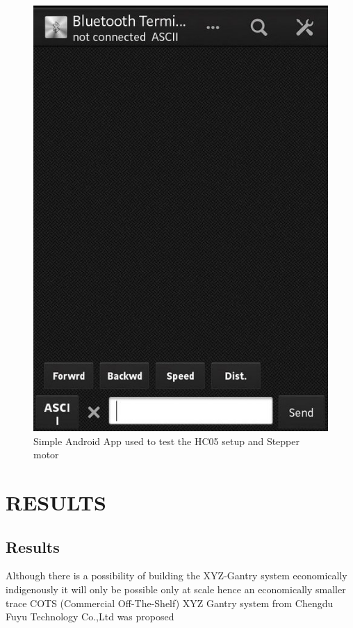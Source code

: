 \documentclass[MTech]{iitmdiss}
\begin{document}
	\begin{figure}[h]
		\includegraphics[scale=0.4]{ffigures/androidapp}
		\centering
		\caption{Simple Android App used to test the HC05 setup and Stepper motor}
		\label{fig:androidapp}
	
	\end{figure}
	
	
\chapter{RESULTS}

\section{Results}


Although there is a possibility of building the XYZ-Gantry system economically indigenously it will only be possible only at scale hence an economically smaller trace COTS (Commercial Off-The-Shelf) XYZ Gantry system from Chengdu Fuyu Technology Co.,Ltd was proposed
\end{document}
